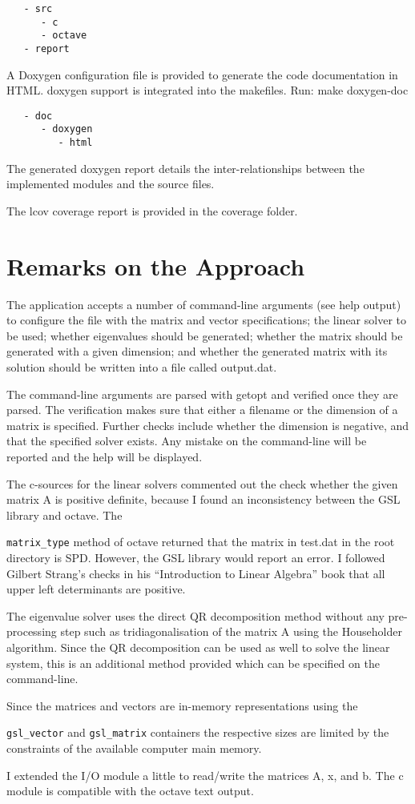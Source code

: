\documentclass{article}
\def\ccode#1{
  \lstinline[basicstyle=\ttfamily,language=C]{#1} }
\begin{document}
\begin{verbatim}
   - src
      - c
      - octave
   - report
\end{verbatim}

A Doxygen configuration file is provided to generate the code
documentation in HTML. doxygen support is integrated into the
makefiles.  Run: make doxygen-doc

\begin{verbatim}
   - doc
      - doxygen
         - html
\end{verbatim}

The generated doxygen report details the inter-relationships between
the implemented modules and the source files.

The lcov coverage report is provided in the coverage folder.


\section{Remarks on the Approach}
\label{sec:remarks-approach}

The application accepts a number of command-line arguments (see help
output) to configure the file with the matrix and vector
specifications; the linear solver to be used; whether eigenvalues
should be generated; whether the matrix should be generated with a
given dimension; and whether the generated matrix with its solution
should be written into a file called output.dat.

The command-line arguments are parsed with getopt and verified once
they are parsed. The verification makes sure that either a filename or
the dimension of a matrix is specified. Further checks include whether
the dimension is negative, and that the specified solver exists. Any
mistake on the command-line will be reported and the help will be
displayed.

The c-sources for the linear solvers commented out the check whether
the given matrix A is positive definite, because I found an
inconsistency between the GSL library and octave. The
\ccode{matrix_type} method of octave returned that the matrix in
test.dat in the root directory is SPD. However, the GSL library would
report an error. I followed Gilbert Strang's checks in his
``Introduction to Linear Algebra'' book that all upper left
determinants are positive.

The eigenvalue solver uses the direct QR decomposition method without
any pre-processing step such as tridiagonalisation of the matrix A
using the Householder algorithm. Since the QR decomposition can be
used as well to solve the linear system, this is an additional method
provided which can be specified on the command-line.

Since the matrices and vectors are in-memory representations using the
\ccode{gsl_vector} and \ccode{gsl_matrix} containers the respective
sizes are limited by the constraints of the available computer main
memory.

I extended the I/O module a little to read/write the matrices A, x,
and b. The c module is compatible with the octave text output.
\end{document}
